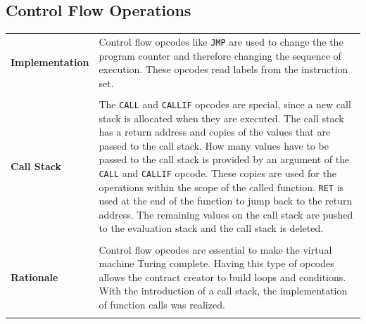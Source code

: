 \subsection{Control Flow Operations}
\begin{tabular}[t]{ p{3cm} p{12.5cm}}
\raggedright
\textbf{Implementation} &
Control flow opcodes like \texttt{JMP} are used to change the  the program counter and therefore changing the sequence of execution. These opcodes read labels from the instruction set. \\ \\

\textbf{Call Stack} &
The \texttt{CALL} and \texttt{CALLIF} opcodes are special, since a new call stack is allocated when they are executed. The call stack has a return address and copies of the values that are passed to the call stack. How many values have to be passed to the call stack is provided by an argument of the \texttt{CALL} and \texttt{CALLIF} opcode. These copies are used for the operations within the scope of the called function. \texttt{RET} is used at the end of the function to jump back to the return address. The remaining values on the call stack are pushed to the evaluation stack and the call stack is deleted. \\ \\

\raggedright
\textbf{Rationale} &
Control flow opcodes are essential to make the virtual machine Turing complete. Having this type of opcodes allows the contract creator to build loops and conditions. With the introduction of a call stack, the implementation of function calls was realized. \\ \\

\end{tabular}

